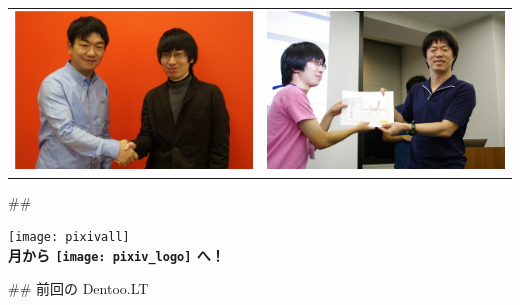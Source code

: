 \begin{center}
 \begin{tabular}{cc}
   \includegraphics[clip, height=38truemm]{pixiv} & \includegraphics[clip, height=38truemm]{hatena} \\ 
  \end{tabular}
 \end{center}

## 

\begin{center}
 \LARGE
 \texttt{[image: pixivall]}\\
 \bfseries{} 月から \texttt{[image: pixiv\_logo]} \hspace{2pt}  へ！
\end{center}


## 前回の Dentoo.LT

\vspace{-70pt}

